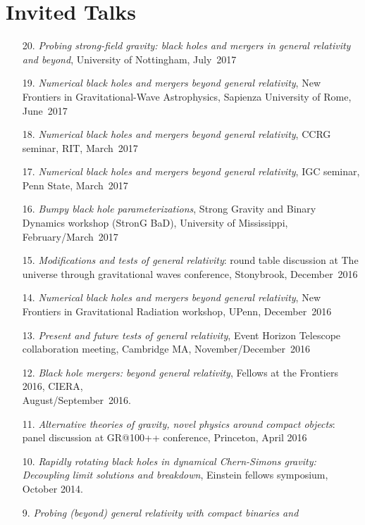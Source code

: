\newcommand{\playsymbol}{$\blacktriangleright$}
\section{\sc Invited Talks}
\begin{enumerate}
\item[{20.}]
  {\it Probing strong-field gravity: black holes and mergers in
    general relativity and beyond},
  University of Nottingham, July~2017
\item[{19.}]
  {\it Numerical black holes and mergers beyond general relativity},
  New Frontiers in Gravitational-Wave Astrophysics,
  Sapienza University of Rome, June~2017
\item[{18.}]
  {\it Numerical black holes and mergers beyond general
    relativity}, CCRG seminar, RIT, March~2017
\item[{17.}]
  {\it Numerical black holes and mergers beyond general
    relativity}, IGC seminar, Penn State, March~2017
\item[{16.}]
  {\it Bumpy black hole parameterizations}, Strong Gravity
  and Binary Dynamics workshop (StronG BaD), University of
  Mississippi, February/March~2017
\item[{15.}]
  {\it Modifications and tests of general relativity}:
  round table discussion at
  The universe through gravitational waves conference,
  Stonybrook, December~2016
\item[{14.}]
  {\it Numerical black holes and mergers beyond general relativity},
  New Frontiers in Gravitational Radiation workshop, UPenn, December~2016
\item[{13.}]
  {\it Present and future tests of general relativity},
  Event Horizon Telescope collaboration meeting, Cambridge MA,
  November/December~2016
\item[{12.}]
  {\it Black hole mergers: beyond general relativity},
  Fellows at the Frontiers 2016, CIERA,\\ August/September~2016.
\item[{11.}]
  {\it Alternative theories of gravity, novel physics
    around compact objects}: panel discussion at GR@100++ conference,
  Princeton, April 2016
\item[{10.}]
  {\it Rapidly rotating black holes in dynamical Chern-Simons gravity:
    Decoupling limit solutions and breakdown},
  Einstein fellows symposium, October 2014.
\item[{9.}]
  {\it Probing (beyond) general relativity with compact binaries and
}
\end{enumerate}
